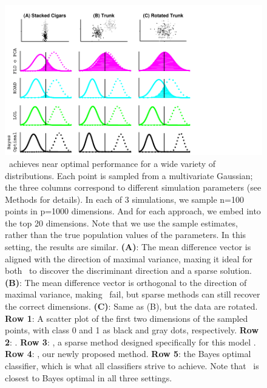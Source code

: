 \documentclass[10pt]{article}
\begin{document}
\begin{figure}%
\centering
\includegraphics[width=0.6\linewidth,trim=0in 0in 1.5in 0in,clip=true]{../Figs/cigars_est}%
\caption{
\Lol~achieves near optimal performance for a wide variety of distributions. 
Each point is sampled from a multivariate Gaussian; 
the three columns correspond to different simulation parameters (see Methods for details).  
In each of 3 simulations, we sample n=100 points in p=1000 dimensions.  And for each approach, we embed into the top 20 dimensions. Note that we use the sample estimates, rather than the true population values of the parameters.  In this setting, the results are  similar.
\textbf{(A)}: The mean difference vector is aligned with the direction of maximal variance, maxing it ideal for both \Pca~to discover the discriminant direction and a sparse solution.  
\textbf{(B)}: The mean difference vector is orthogonal to the direction of maximal variance, making \Pca~fail, but sparse methods can still recover the correct dimensions.
\textbf{(C)}: Same as (B), but the data are rotated.  
\textbf{Row 1}: A scatter plot of the first two dimensions of the sampled points, with class 0 and 1 as black and gray dots, respectively.  
\textbf{Row 2}: .
\textbf{Row 3}: , a sparse method designed specifically for this model \cite{Fan2012a}.
\textbf{Row 4}: \Lol, our newly proposed method.
\textbf{Row 5}: the Bayes optimal classifier, which is what all classifiers strive to achieve.
Note that \Lol~is closest to Bayes optimal in all three settings.
}
\label{fig:cigars}
\end{figure}
\end{document}
